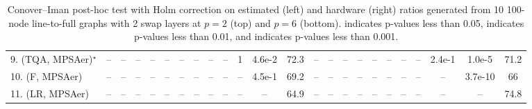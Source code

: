 \begin{table}[ht]
{\begin{tabular}{l|cccccccccccc|ccccccccccc|}
9. (TQA, MPSAer)$^\star$ & -- & -- & -- & -- & -- & -- & -- & -- & -- & 1 & {\cellcolor[HTML]{B5E1AE}} \color[HTML]{000000} 4.6e-2 & 72.3 & -- & -- & -- & -- & -- & -- & -- & -- & 2.4e-1 & {\cellcolor[HTML]{00441B}} \color[HTML]{F1F1F1} 1.0e-5 & 71.2 \\
10. (F, MPSAer) & -- & -- & -- & -- & -- & -- & -- & -- & -- & -- & 4.5e-1 & 69.2 & -- & -- & -- & -- & -- & -- & -- & -- & -- & {\cellcolor[HTML]{00441B}} \color[HTML]{F1F1F1} 3.7e-10 & 66 \\
11. (LR, MPSAer) & -- & -- & -- & -- & -- & -- & -- & -- & -- & -- & -- & 64.9 & -- & -- & -- & -- & -- & -- & -- & -- & -- & -- & 74.8 \\
\hline

\end{tabular}
}
\caption{Conover–Iman post-hoc test with Holm correction on estimated (left) and hardware (right) ratios generated from 10 100-node line-to-full graphs with 2 swap layers at $p=2$ (top) and $p=6$ (bottom).  indicates p-values less than 0.05,  indicates p-values less than 0.01, and  indicates p-values less than 0.001.}
\label{tab:N100L2S2_2_6_100pc_hw}
\end{table}